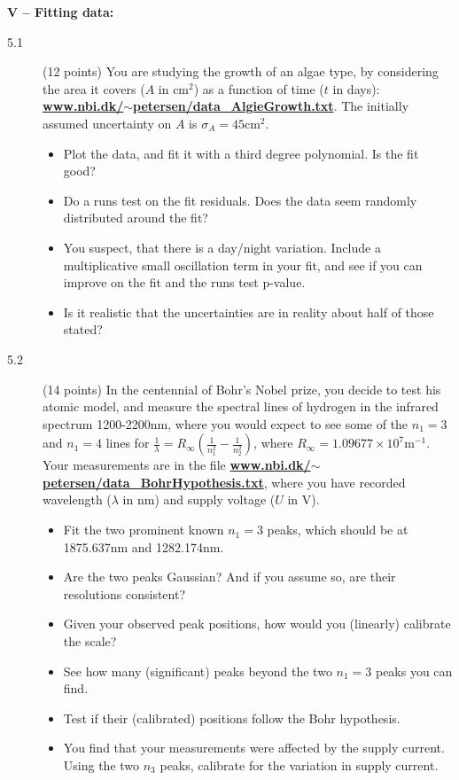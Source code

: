\documentclass[11pt]{article}
\begin{document}

\noindent
{\bf V -- Fitting data:}
\begin{description}
\item[5.1] (12 points)
  You are studying the growth of an algae type, by considering the area it covers ($A$ in $\mbox{cm}^2$)
  as a function of time ($t$ in days):
  \href{http://www.nbi.dk/~petersen/data\_AlgieGrowth.txt}{\bf www.nbi.dk/$\sim$petersen/data\_AlgieGrowth.txt}.
  The initially assumed uncertainty on $A$ is $\sigma_A = 45 \mbox{cm}^2$.
  \vspace{-1.0ex}
  \begin{itemize}
    \item Plot the data, and fit it with a third degree polynomial. Is the fit good?
    \item Do a runs test on the fit residuals. Does the data seem randomly distributed around the fit?
    \item You suspect, that there is a day/night variation. Include a multiplicative small oscillation term in
      your fit, and see if you can improve on the fit and the runs test p-value.
    \item Is it realistic that the uncertainties are in reality about half of those stated?
  \end{itemize}
%
\item[5.2] (14 points)
  In the centennial of Bohr's Nobel prize, you decide to test his atomic model, and measure the spectral
  lines of hydrogen in the infrared spectrum 1200-2200nm, where you would expect to see some of the
  $n_1 = 3$ and $n_1 = 4$ lines for $\frac{1}{\lambda} = R_{\infty} \left( \frac{1}{n_1^2} - \frac{1}{n_2^2} \right)$,
  where $R_{\infty} = 1.09677 \times 10^7 \mbox{m}^{-1}$.
  Your measurements are in the file \href{http://www.nbi.dk/~petersen/data\_BohrHypothesis.txt}{\bf www.nbi.dk/$\sim$petersen/data\_BohrHypothesis.txt}, where you have recorded wavelength ($\lambda$ in nm) and supply voltage ($U$ in V).
  \vspace*{-1ex}
  \begin{itemize}
    \item Fit the two prominent known $n_1 = 3$ peaks, which should be at 1875.637nm and 1282.174nm.
    \item Are the two peaks Gaussian? And if you assume so, are their resolutions consistent?
    \item Given your observed peak positions, how would you (linearly) calibrate the scale?
    \item See how many (significant) peaks beyond the two $n_1 = 3$ peaks you can find.
    \item Test if their (calibrated) positions follow the Bohr hypothesis.
    \item You find that your measurements were affected by the supply current. Using the two $n_3$ peaks,
      calibrate for the variation in supply current.
  \end{itemize}
\vspace*{-2ex}
\end{description}
\end{document}
